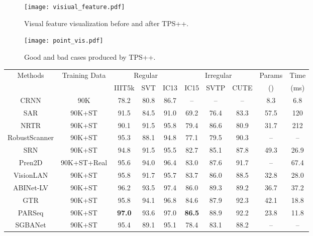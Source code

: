 \documentclass{article}
\begin{document}
\begin{figure}[t]
\centering
\texttt{[image:  visiual\_feature.pdf]} 
\caption{Visual feature visualization before and after TPS++.}
\label{fig1:vis_feature}
\end{figure}
\begin{figure}[t]
\centering
\texttt{[image:  point\_vis.pdf]} 
\caption{Good and bad cases produced by TPS++.}
\label{fig:vis_point}
\end{figure}


\begin{table*}[h]
\centering
\begin{tabular}{c|c|c|c|c|c|c|c|c|c}
	\hline
	\multirow{2}{*}{Methods} & \multirow{2}{*}{Training Data}   & \multicolumn{3}{c}{Regular} & \multicolumn{3}{|c|}{Irregular} & \multirow{1}{*}{Params} &\multirow{1}{*}{Time}  \\
\cline{3-8}
	&  &IIIT5k & SVT  & IC13 &  IC15 & SVTP & CUTE & () & (ms)  \\
	\hline
CRNN\cite{ShiBY17crnn}  & 90K & 78.2  & 80.8 & 86.7 & -- & --& -- & 8.3 & 6.8 \\
SAR\cite{li2019sar} & 90K+ST & 91.5 & 84.5 & 91.0 & 69.2 & 76.4 & 83.3 & 57.5 & 120\\
NRTR\cite{sheng2019nrtr}  & 90K+ST & 90.1 & 91.5 & 95.8 & 79.4 & 86.6 & 80.9 & 31.7 & 212\\
RobustScanner\cite{yue2020robustscanner} & 90K+ST  & 95.3 & 88.1 & 94.8 & 77.1 & 79.5 & 90.3 & -- &--\\
SRN\cite{SRNyu2020towards}  & 90K+ST & 94.8 & 91.5 & 95.5 & 82.7 & 85.1 & 87.8 & 49.3 & 26.9\\
Pren2D\cite{yan2021primitive} & 90K+ST+Real & 95.6 & 94.0 & 96.4& 83.0 & 87.6& 91.7 & -- & 67.4\\
VisionLAN\cite{wang2021FTO} & 90K+ST  & 95.8& 91.7& 95.7 & 83.7 & 86.0 & 88.5 & 32.8 & 28.0\\
ABINet-LV\cite{ABInet21CVPR}  & 90K+ST & 96.2 &93.5& 97.4& 86.0 &89.3&89.2 & 36.7 & 37.2\\
GTR\cite{he2021S-GTR} & 90K+ST & 95.8 & 94.1 & 96.8 & 84.6 & 87.9 &92.3 & 42.1 & 18.8 \\
PARSeq\cite{bautista2022parseq}& 90K+ST &\textbf{97.0} &93.6 &  97.0 & \textbf{86.5} & 88.9 & 92.2& 23.8 & 11.8\\
SGBANet\cite{zhong2022sgbanet} & 90K+ST & 95.4 & 89.1 & 95.1 & 78.4 & 83.1 & 88.2  & -- &--\\


\end{tabular}
\end{table*}
\end{document}
